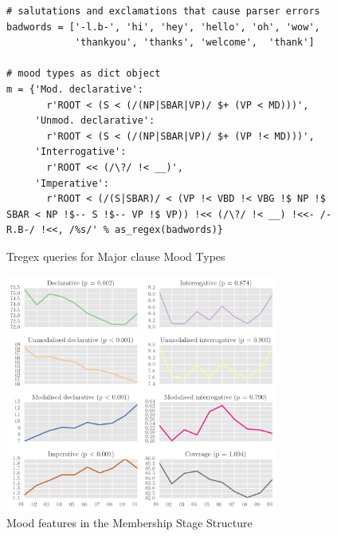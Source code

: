 
\begin{figure}[htb]
\centering
\begin{verbatim}
# salutations and exclamations that cause parser errors
badwords = ['-l.b-', 'hi', 'hey', 'hello', 'oh', 'wow',
            'thankyou', 'thanks', 'welcome',  'thank']

# mood types as dict object
m = {'Mod. declarative':
       r'ROOT < (S < (/(NP|SBAR|VP)/ $+ (VP < MD)))',
     'Unmod. declarative':
       r'ROOT < (S < (/(NP|SBAR|VP)/ $+ (VP !< MD)))',
     'Interrogative':
       r'ROOT << (/\?/ !< __)',
     'Imperative':
       r'ROOT < (/(S|SBAR)/ < (VP !< VBD !< VBG !$ NP !$ SBAR < NP !$-- S !$-- VP !$ VP)) !<< (/\?/ !< __) !<<- /-R.B-/ !<<, /%s/' % as_regex(badwords)}
\end{verbatim}
\caption{Tregex queries for Major clause Mood Types}
\label{fig:mood_dict}
\end{figure}

\begin{figure}[htb]
\centering
\includegraphics[width=0.8\textwidth]{../images/known-mood-and-indicative-types-in-p-corpus.png}
\caption{Mood features in the Membership Stage Structure}
\label{fig:mood_types_P}
\end{figure}